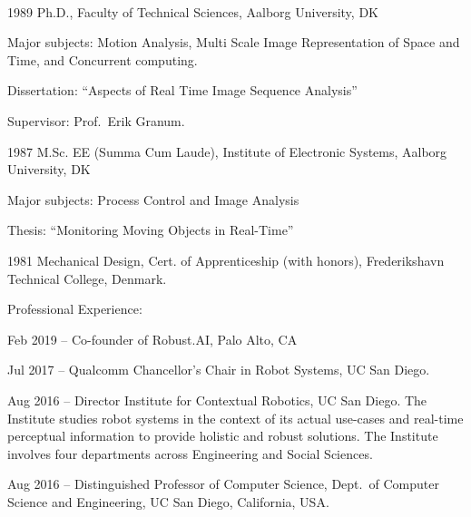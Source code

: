 \documentclass{article}
\newenvironment{sublist}{%
  \begin{list}{}{%
      \setlength{\itemsep}{0em}\setlength{\parsep}{0em}%
      \setlength{\topsep}{0em}\setlength{\parskip}{0em}%
    }%
}%
{ \end{list} }
\begin{document}
\begin{cv}
  \begin{cvlist}{~}
  \item[1989] Ph.D., Faculty of Technical Sciences, Aalborg
    University, DK
    \begin{sublist}
    \item Major subjects: Motion Analysis, Multi Scale Image
      Representation of Space and Time, and Concurrent computing.
    \item Dissertation: ``Aspects of Real Time Image Sequence
      Analysis''
    \item Supervisor: Prof.\ Erik Granum.
    \end{sublist}
  \item[1987] M.Sc. EE (Summa Cum Laude), Institute of Electronic
    Systems, Aalborg University, DK
    \begin{sublist}
    \item Major subjects: Process Control and Image Analysis
    \item Thesis: ``Monitoring Moving Objects in Real-Time''
    \end{sublist}
  \item[1981] Mechanical Design, Cert.
    of Apprenticeship (with honors), Frederikshavn Technical
    College, Denmark.
\end{cvlist}



\begin{cvlist}{Professional Experience:}


\item[Feb 2019 --] Co-founder of Robust.AI, Palo Alto, CA

\item[Jul 2017 --] Qualcomm Chancellor's Chair in Robot Systems, UC San Diego.

\item[Aug 2016 --] Director Institute for Contextual Robotics, UC San
  Diego. The Institute studies robot systems in the context of its
  actual use-cases and real-time perceptual information to provide
  holistic and robust solutions. The Institute involves four
  departments across Engineering and Social Sciences.

\item[Aug 2016 --] Distinguished Professor of Computer Science, Dept.\ of
  Computer Science and Engineering, UC San Diego, California, USA.\@


\end{cvlist}
\end{cv}
\end{document}
